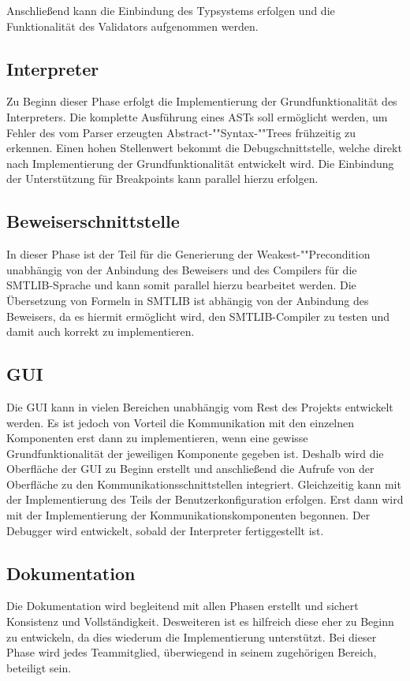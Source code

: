 
Anschließend kann die Einbindung des Typsystems erfolgen und die Funktionalität des Validators aufgenommen werden.

\subsection{Interpreter}
Zu Beginn dieser Phase erfolgt die Implementierung der Grundfunktionalität des Interpreters. Die komplette Ausführung eines ASTs soll ermöglicht werden, um Fehler des vom Parser erzeugten Abstract-""Syntax-""Trees frühzeitig zu erkennen. Einen hohen Stellenwert bekommt die Debugschnittstelle, welche direkt nach Implementierung der Grundfunktionalität entwickelt wird. Die Einbindung der Unterstützung für Breakpoints kann parallel hierzu erfolgen.

\subsection{Beweiserschnittstelle}
In dieser Phase ist der Teil für die Generierung der Weakest-""Precondition unabhängig von der Anbindung des Beweisers und des Compilers für die SMTLIB-Sprache und kann somit parallel hierzu bearbeitet werden. Die Übersetzung von Formeln in SMTLIB ist abhängig von der Anbindung des Beweisers, da es hiermit ermöglicht wird, den SMTLIB-Compiler zu testen und damit auch korrekt zu implementieren.

\subsection{GUI}
Die GUI kann in vielen Bereichen unabhängig vom Rest des Projekts entwickelt werden. Es ist jedoch von Vorteil die Kommunikation mit den einzelnen Komponenten erst dann zu implementieren, wenn eine gewisse Grundfunktionalität der jeweiligen Komponente gegeben ist. Deshalb wird die Oberfläche der GUI zu Beginn erstellt und anschließend die Aufrufe von der Oberfläche zu den Kommunikationsschnittstellen integriert. Gleichzeitig kann mit der Implementierung des Teils der Benutzerkonfiguration erfolgen. Erst dann wird mit der Implementierung der Kommunikationskomponenten begonnen. Der Debugger wird entwickelt, sobald der Interpreter fertiggestellt ist.

\subsection{Dokumentation}
Die Dokumentation wird begleitend mit allen Phasen erstellt und sichert Konsistenz und Vollständigkeit. Desweiteren ist es hilfreich diese eher zu Beginn zu entwickeln, da dies wiederum die Implementierung unterstützt. Bei dieser Phase wird jedes Teammitglied, überwiegend in seinem zugehörigen Bereich, beteiligt sein.
